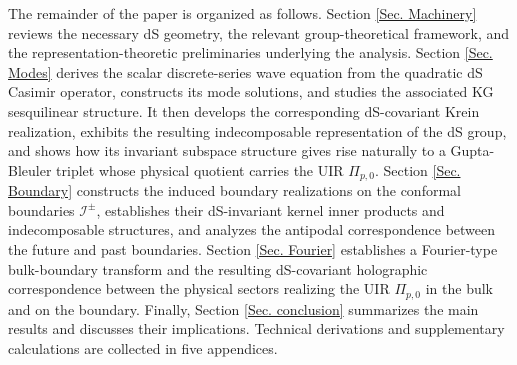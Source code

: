 \documentclass[aps,twocolumn,nofootinbib]{revtex4}
\begin{document}
The remainder of the paper is organized as follows. Section \ref{Sec. Machinery} reviews the necessary dS geometry, the relevant group-theoretical framework, and the representation-theoretic preliminaries underlying the analysis. Section \ref{Sec. Modes} derives the scalar discrete-series wave equation from the quadratic dS Casimir operator, constructs its mode solutions, and studies the associated KG sesquilinear structure. It then develops the corresponding dS-covariant Krein realization, exhibits the resulting indecomposable representation of the dS group, and shows how its invariant subspace structure gives rise naturally to a Gupta-Bleuler triplet whose physical quotient carries the UIR $\Pi_{p,0}$. Section \ref{Sec. Boundary} constructs the induced boundary realizations on the conformal boundaries ${\mathcal{I}}^{\pm}$, establishes their dS-invariant kernel inner products and indecomposable structures, and analyzes the antipodal correspondence between the future and past boundaries. Section \ref{Sec. Fourier} establishes a Fourier-type bulk-boundary transform and the resulting dS-covariant holographic correspondence between the physical sectors realizing the UIR $\Pi_{p,0}$ in the bulk and on the boundary. Finally, Section \ref{Sec. conclusion} summarizes the main results and discusses their implications. Technical derivations and supplementary calculations are collected in five appendices.
\end{document}

